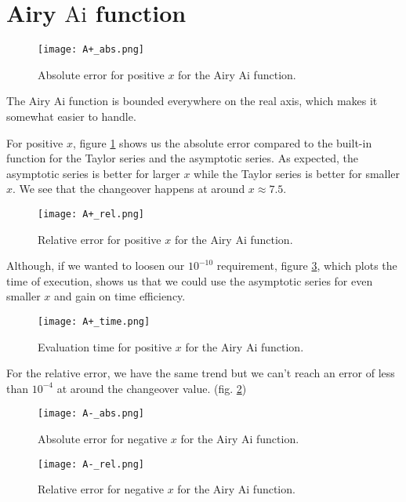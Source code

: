 \documentclass[10pt,a4paper,twocolumn]{article}
\newcommand{\Ai}{\mathrm{Ai}}
\begin{document}
\section{Airy $\Ai$ function}

\begin{figure}[H]
\centering
\captionsetup{justification=centering}
\texttt{[image: A+\_abs.png]}
\caption{Absolute error for positive $x$ for the Airy $\Ai$ function.}
\label{fig:A+_abs}
\end{figure}

The Airy $\Ai$ function is bounded everywhere on the real axis, which makes it somewhat easier to handle.

For positive $x$, figure \ref{fig:A+_abs} shows us the absolute error compared to the built-in function for the Taylor series and the asymptotic series. As expected, the asymptotic series is better for larger $x$ while the Taylor series is better for smaller $x$. We see that the changeover happens at around $x \approx 7.5$.

\begin{figure}[H]
\centering
\captionsetup{justification=centering}
\texttt{[image: A+\_rel.png]}
\caption{Relative error for positive $x$ for the Airy $\Ai$ function.}
\label{fig:A+_rel}
\end{figure}

Although, if we wanted to loosen our $10^{-10}$ requirement, figure \ref{fig:A+_time}, which plots the time of execution, shows us that we could use the asymptotic series for even smaller $x$ and gain on time efficiency.

\begin{figure}[H]
\centering
\captionsetup{justification=centering}
\texttt{[image: A+\_time.png]}
\caption{Evaluation time for positive $x$ for the Airy $\Ai$ function.}
\label{fig:A+_time}
\end{figure}

For the relative error, we have the same trend but we can't reach an error of less than $10^{-4}$ at around the changeover value. (fig. \ref{fig:A+_rel})

\begin{figure}[H]
\centering
\captionsetup{justification=centering}
\texttt{[image: A-\_abs.png]}
\caption{Absolute error for negative $x$ for the Airy $\Ai$ function.}
\label{fig:A-_abs}
\end{figure}

\begin{figure}[H]
\centering
\captionsetup{justification=centering}
\texttt{[image: A-\_rel.png]}
\caption{Relative error for negative $x$ for the Airy $\Ai$ function.}
\label{fig:A-_rel}
\end{figure}
\end{document}
